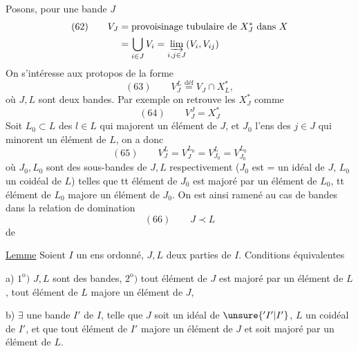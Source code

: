 Posons, pour une bande $J$
\[
\begin{aligned}
(62)\qquad V_J&=\text{provoisinage tubulaire de }X_J^*\text{ dans }X\\
&=\bigcup_{i\in J}V_i=\varinjlim_{i,j\in J}(V_i,V_{ij})
\end{aligned}
\]
On s'intéresse aux protopos de la forme
\[
(63)\qquad V_J^L\overset{\mathrm{déf}}{=}V_J\cap X_L^*,
\]
où $J,L$ sont deux bandes. Par exemple on retrouve les $X_J^*$ comme
\[
(64)\qquad V_J^J=X_J^*
\]
Soit $L_0\subset L$  des $l\in L$ qui majorent un élément de $J$, et $J_0$ l'ens des $j\in J$ qui minorent un élément de $L$, on a donc
\[
(65)\qquad V_J^L=V_J^{L_0}=V_{J_0}^L=V_{J_0}^{L_0}
\]
où $J_0,L_0$ sont des sous-bandes de $J,L$ respectivement ($J_0$ est = un idéal de $J$, $L_0$ un coidéal de $L$) telles que tt élément de $J_0$ est majoré par un élément de $L_0$, tt élément de $L_0$ majore un élément de $J_0$. On est ainsi ramené au cas de bandes dans la relation de domination
\[
(66)\qquad J\prec L
\]
de


\uline{Lemme} Soient $I$ un ens ordonné, $J,L$ deux parties de $I$. Conditions équivalentes

a) $1^{\mathrm o})$ $J,L$ sont des bandes, $2^{\mathrm o})$ tout élément de $J$ est majoré par un élément de $L$, tout élément de $L$ majore un élément de $J$, 

b) $\exists$ une bande $I'$ de $I$, telle que $J$ soit un idéal de $\unsure{{}'I'|I'}$, $L$ un coidéal de $I'$, et que tout élément de $I'$ majore un élément de $J$ et soit majoré par un élément de $L$.

